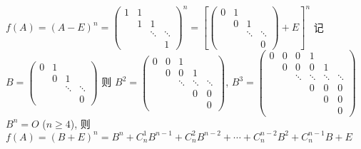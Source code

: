 	 \paragraph{} %
		 $f(A) = (A-E)^n = \begin{pmatrix}
				 1 & 1 &        &        \\
				   & 1 & 1      &        \\
				   &   & \ddots & \ddots \\
				   &   &        & 1
			 \end{pmatrix}^n = \left[\begin{pmatrix}
					 0 & 1 &        &        \\
					   & 0 & 1      &        \\
					   &   & \ddots & \ddots \\
					   &   &        & 0
				 \end{pmatrix} + E\right]^n$
		 记 $B = \begin{pmatrix}
				 0 & 1 &        &        \\
				   & 0 & 1      &        \\
				   &   & \ddots & \ddots \\
				   &   &        & 0
			 \end{pmatrix}$ 则 $B^2 = \begin{pmatrix}
				 0 & 0 & 1      &        &        \\
				   & 0 & 0      & 1      &        \\
				   &   & \ddots & \ddots & \ddots \\
				   &   &        & 0      & 0      \\
				   &   &        &        & 0
			 \end{pmatrix}$, $B^3 = \begin{pmatrix}
				 0 & 0 & 0      & 1      &        &        \\
				   & 0 & 0      & 0      & 1      &        \\
				   &   & \ddots & \ddots & \ddots & \ddots \\
				   &   &        & 0      & 0      & 0      \\
				   &   &        &        & 0      & 0      \\
				   &   &        &        &        & 0
			 \end{pmatrix}$
		 $B^n = O$ ($n \geq 4$), 则
		 $f(A) = (B+E)^n = B^n + C_n^1B^{n-1} + C_n^2B^{n-2} + \cdots + C_n^{n-2}B^2 + C_n^{n-1}B + E$
